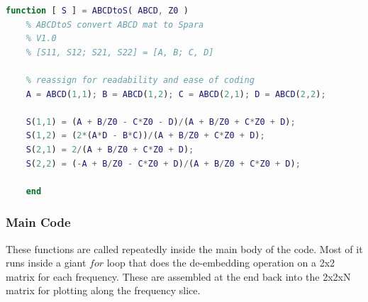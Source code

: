\documentclass{article} %
\begin{document}
	\begin{lstlisting}[language=Matlab, caption=ABCD to S-parameters]
	function [ S ] = ABCDtoS( ABCD, Z0 )
	% ABCDtoS convert ABCD mat to Spara
	% V1.0
	% [S11, S12; S21, S22] = [A, B; C, D]
	
	% reassign for readability and ease of coding
	A = ABCD(1,1); B = ABCD(1,2); C = ABCD(2,1); D = ABCD(2,2);
	
	S(1,1) = (A + B/Z0 - C*Z0 - D)/(A + B/Z0 + C*Z0 + D);
	S(1,2) = (2*(A*D - B*C))/(A + B/Z0 + C*Z0 + D);
	S(2,1) = 2/(A + B/Z0 + C*Z0 + D);
	S(2,2) = (-A + B/Z0 - C*Z0 + D)/(A + B/Z0 + C*Z0 + D);
	
	end	
	\end{lstlisting}
	
	\subsubsection{Main Code}
	These functions are called repeatedly inside the main body of the code.  Most of it runs inside a giant $for$ loop that does the de-embedding operation on a 2x2 matrix for each frequency.  These are assembled at the end back into the 2x2xN matrix for plotting along the frequency slice. 
	
\end{document}
